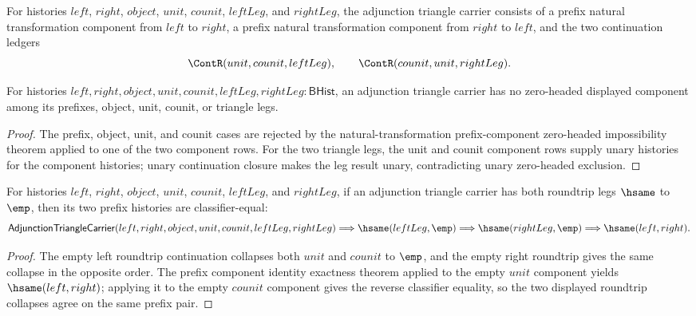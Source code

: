 \begin{definition}
\label{def:adjunction-triangle-carrier}
For histories $left$, $right$, $object$, $unit$, $counit$, $leftLeg$, and
$rightLeg$, the adjunction triangle carrier consists of a prefix natural
transformation component from $left$ to $right$, a prefix natural
transformation component from $right$ to $left$, and the two continuation
ledgers
$$
\ContR(unit,counit,leftLeg),\qquad
\ContR(counit,unit,rightLeg).
$$
\end{definition}

\begin{theorem}
\label{thm:adjunction-triangle-carrier-zero-headed-component-absurd}
For histories $left,right,object,unit,counit,leftLeg,rightLeg:\mathsf{BHist}$,
an adjunction triangle carrier has no zero-headed displayed component among
its prefixes, object, unit, counit, or triangle legs.
\end{theorem}
\begin{proof}
The prefix, object, unit, and counit cases are rejected by the
natural-transformation prefix-component zero-headed impossibility theorem
applied to one of the two component rows. For the two triangle legs, the unit
and counit component rows supply unary histories for the component histories;
unary continuation closure makes the leg result unary, contradicting unary
zero-headed exclusion.
\end{proof}

\begin{theorem}
\label{thm:adjunction-empty-roundtrip-prefix-deterministic}
For histories $left$, $right$, $object$, $unit$, $counit$, $leftLeg$, and
$rightLeg$, if an adjunction triangle carrier has both roundtrip legs
$\hsame$ to $\emp$, then its two prefix histories are classifier-equal:
$$
\mathsf{AdjunctionTriangleCarrier}(left,right,object,unit,counit,leftLeg,rightLeg)
\Longrightarrow
\hsame(leftLeg,\emp)\Longrightarrow
\hsame(rightLeg,\emp)\Longrightarrow
\hsame(left,right).
$$
\end{theorem}
\begin{proof}
The empty left roundtrip continuation collapses both $unit$ and $counit$ to
$\emp$, and the empty right roundtrip gives the same collapse in the opposite
order. The prefix component identity exactness theorem applied to the empty
$unit$ component yields $\hsame(left,right)$; applying it to the empty $counit$
component gives the reverse classifier equality, so the two displayed
roundtrip collapses agree on the same prefix pair.
\end{proof}


